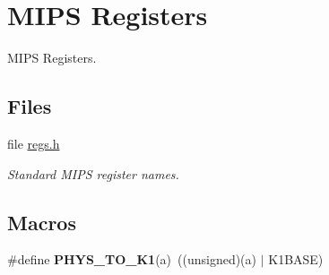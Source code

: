 \hypertarget{group__mips__regs}{}\section{M\+I\+PS Registers}
\label{group__mips__regs}


M\+I\+PS Registers.  


\subsection*{Files}
\begin{DoxyCompactItemize}
\item 
file \mbox{\hyperlink{mips_2include_2bsp_2regs_8h}{regs.\+h}}
\begin{DoxyCompactList}\small\item\em Standard M\+I\+PS register names. \end{DoxyCompactList}\end{DoxyCompactItemize}
\subsection*{Macros}
\begin{DoxyCompactItemize}
\item 
\mbox{\label{group__mips__regs_gaafc868e00799f394fa2678cabc7e3920}} 
\#define {\bfseries P\+H\+Y\+S\+\_\+\+T\+O\+\_\+\+K1}(a)~((unsigned)(a) $\vert$ K1\+B\+A\+SE)
\end{DoxyCompactItemize}
